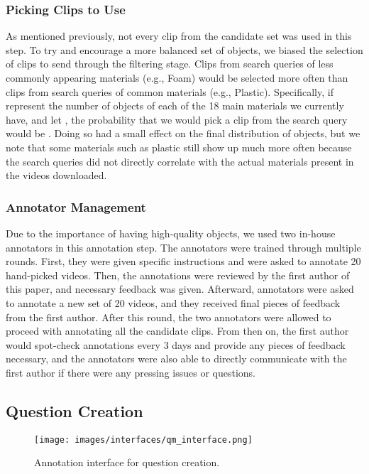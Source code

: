 \documentclass[runningheads]{llncs}
\begin{document}
\subsubsection{Picking Clips to Use}
As mentioned previously, not every clip from the candidate set was used in this step. To try and encourage a more balanced set of objects, we biased the selection of clips to send through the filtering stage. Clips from search queries of less commonly appearing materials (e.g., Foam) would be selected more often than clips from search queries of common materials (e.g., Plastic). Specifically, if  represent the number of objects of each of the 18 main materials we currently have, and let , the probability that we would pick a clip from the search query  would be . Doing so had a small effect on the final distribution of objects, but we note that some materials such as plastic still show up much more often because the search queries did not directly correlate with the actual materials present in the videos downloaded. 

\subsubsection{Annotator Management}

Due to the importance of having high-quality objects, we used two in-house annotators in this annotation step. The annotators were trained through multiple rounds. First, they were given specific instructions and were asked to annotate 20 hand-picked videos. Then, the annotations were reviewed by the first author of this paper, and necessary feedback was given. Afterward, annotators were asked to annotate a new set of 20 videos, and they received final pieces of feedback from the first author. After this round, the two annotators were allowed to proceed with annotating all the candidate clips. From then on, the first author would spot-check annotations every 3 days and provide any pieces of feedback necessary, and the annotators were also able to directly communicate with the first author if there were any pressing issues or questions. 

\subsection{Question Creation}\label{appendix:data3}

\begin{figure}[t]
    \centering
  \texttt{[image: images/interfaces/qm\_interface.png]}
  \caption{Annotation interface for question creation.}
  \label{fig:qm_interface}
\end{figure}
\end{document}
